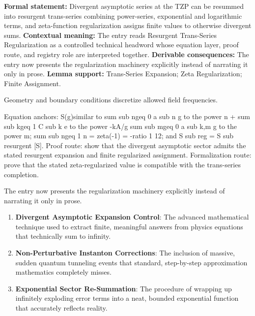 \begingroup\footnotesize\setlength{\emergencystretch}{3em}\sloppy
\textbf{Formal statement:} Divergent asymptotic series at the TZP can be resummed into resurgent trans-series combining power-series, exponential and logarithmic terms, and zeta-function regularization assigns finite values to otherwise divergent sums. \textbf{Contextual meaning:} The entry reads Resurgent Trans-Series Regularization as a controlled technical headword whose equation layer, proof route, and registry role are interpreted together. \textbf{Derivable consequences:} The entry now presents the regularization machinery explicitly instead of narrating it only in prose. \textbf{Lemma support:} Trans-Series Expansion; Zeta Regularization; Finite Assignment.\par
\endgroup

Geometry and boundary conditions discretize allowed field frequencies.

Equation anchors: S(g)similar to sum sub ngeq 0 a sub n g to the power n + sum sub kgeq 1 C sub k e to the power -kA/g sum sub mgeq 0 a sub k,m g to the power m; sum sub ngeq 1 n = zeta(-1) = -ratio 1 12; and S sub reg = S sub resurgent [S]. Proof route: show that the divergent asymptotic sector admits the stated resurgent expansion and finite regularized assignment. Formalization route: prove that the stated zeta-regularized value is compatible with the trans-series completion.

The entry now presents the regularization machinery explicitly instead of narrating it only in prose.
\endgroup

\begin{enumerate}[leftmargin=1.6em,itemsep=6pt,topsep=4pt]
\item \textbf{Divergent Asymptotic Expansion Control}: The advanced mathematical technique used to extract finite, meaningful answers from physics equations that technically sum to infinity.
\item \textbf{Non-Perturbative Instanton Corrections}: The inclusion of massive, sudden quantum tunneling events that standard, step-by-step approximation mathematics completely misses.
\item \textbf{Exponential Sector Re-Summation}: The procedure of wrapping up infinitely exploding error terms into a neat, bounded exponential function that accurately reflects reality.
\end{enumerate}

